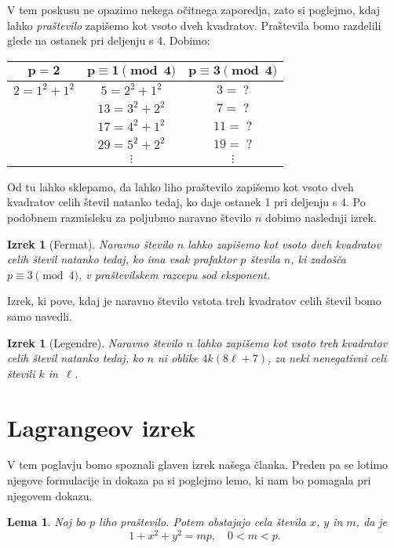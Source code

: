 \documentclass[a4paper]{amsart}
\theoremstyle{definition}
\theoremstyle{plain}
\newtheorem{lema}[definicija]{Lema}
\newtheorem{izrek}[definicija]{Izrek}
\numberwithin{equation}{section}
\begin{document}
V tem poskusu ne opazimo nekega očitnega zaporedja, zato si poglejmo, kdaj lahko \emph{praštevilo} zapišemo kot vsoto dveh kvadratov. Praštevila bomo razdelili glede na ostanek pri deljenju s 4. Dobimo:
\par
\begin{center}
	\begin{tabular}{c|c|c}
	  $\boldsymbol{p=2}$ & $\boldsymbol{p\equiv 1 \pmod{4}}$ & $\boldsymbol{p\equiv 3 \pmod{4}}$ \\
	  \hline 
	  $2=1^2+1^2$ & $5=2^2+1^2$ & $3 = \; ? $ \\
				  & $13=3^2+2^2$ & $7 = \; ? $ \\
				  & $17 = 4^2+1^2$ & $11 = \; ?$ \\
				  & $29=5^2+2^2$ & $19= \; ?$ \\
				  & $\vdots$ & $\vdots$
	\end{tabular}
\end{center}
\par
Od tu lahko sklepamo, da lahko liho praštevilo zapišemo kot vsoto dveh kvadratov celih števil natanko tedaj, ko daje ostanek 1 pri deljenju s 4. Po podobnem razmisleku za poljubmo naravno število $n$ dobimo naslednji izrek.


\begin{izrek}[Fermat]
	Naravno število $n$ lahko zapišemo kot vsoto dveh kvadratov celih števil natanko tedaj, ko ima vsak prafaktor $p$ števila $n$, ki zadošča $p\equiv 3 \pmod{4}$, v praštevilskem razcepu sod eksponent.
\end{izrek}

Izrek, ki pove, kdaj je naravno število vstota treh kvadratov celih števil bomo samo navedli.

\begin{izrek}[Legendre]
	Naravno število $n$ lahko zapišemo kot vsoto treh kvadratov celih števil natanko tedaj, ko $n$ ni oblike $4k(8\ell + 7)$, za neki nenegativni celi števili $k$ in~$\ell$.
\end{izrek}


\section{Lagrangeov izrek}\label{lagrange}

V tem poglavju bomo spoznali glaven izrek našega članka. Preden pa se lotimo njegove formulacije in dokaza pa si poglejmo lemo, ki nam bo pomagala pri njegovem dokazu.

\begin{lema}\label{lema}
	Naj bo $p$ liho praštevilo. Potem obstajajo cela števila $x$, $y$ in $m$, da je $$ 1+x^2 + y^2 = mp, \quad 0<m<p.$$
\end{lema}
\end{document}
